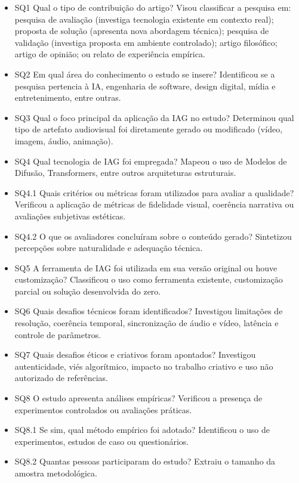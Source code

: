 \begin{itemize}
    \item SQ1 Qual o tipo de contribuição do artigo? Visou classificar a pesquisa em: pesquisa de avaliação (investiga tecnologia existente em contexto real); proposta de solução (apresenta nova abordagem técnica); pesquisa de validação (investiga proposta em ambiente controlado); artigo filosófico; artigo de opinião; ou relato de experiência empírica.
    \item SQ2 Em qual área do conhecimento o estudo se insere? Identificou se a pesquisa pertencia à IA, engenharia de software, design digital, mídia e entretenimento, entre outras.
    \item SQ3 Qual o foco principal da aplicação da IAG no estudo? Determinou qual tipo de artefato audiovisual foi diretamente gerado ou modificado (vídeo, imagem, áudio, animação).
    \item SQ4 Qual tecnologia de IAG foi empregada? Mapeou o uso de Modelos de Difusão, Transformers, entre outros arquiteturas estruturais.
    \item SQ4.1 Quais critérios ou métricas foram utilizados para avaliar a qualidade? Verificou a aplicação de métricas de fidelidade visual, coerência narrativa ou avaliações subjetivas estéticas.
    \item SQ4.2 O que os avaliadores concluíram sobre o conteúdo gerado? Sintetizou percepções sobre naturalidade e adequação técnica.
    \item SQ5 A ferramenta de IAG foi utilizada em sua versão original ou houve customização? Classificou o uso como ferramenta existente, customização parcial ou solução desenvolvida do zero.
    \item SQ6 Quais desafios técnicos foram identificados? Investigou limitações de resolução, coerência temporal, sincronização de áudio e vídeo, latência e controle de parâmetros.
    \item SQ7 Quais desafios éticos e criativos foram apontados? Investigou autenticidade, viés algorítmico, impacto no trabalho criativo e uso não autorizado de referências.
    \item SQ8 O estudo apresenta análises empíricas? Verificou a presença de experimentos controlados ou avaliações práticas.
    \item SQ8.1 Se sim, qual método empírico foi adotado? Identificou o uso de experimentos, estudos de caso ou questionários.
    \item SQ8.2 Quantas pessoas participaram do estudo? Extraiu o tamanho da amostra metodológica.

\end{itemize}
